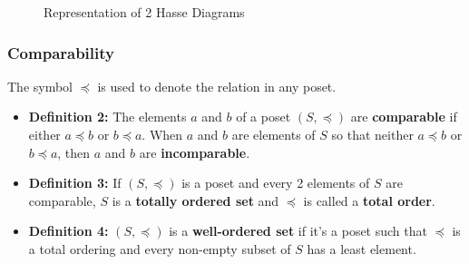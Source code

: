 \documentclass{article}
\begin{document}
\begin{figure}%
    \centering
    \qquad
    \caption{Representation of 2 Hasse Diagrams}%
    \label{fig:hassediagrams}%
\end{figure}

\subsubsection{Comparability} The symbol $ \preceq $ is used to denote the relation in any poset.
\begin{itemize}
\item \textbf{Definition 2:} The elements $ a $ and $ b $ of a poset $ (S, \preceq) $ are \textbf{comparable} if either $ a \preceq b $ or $ b \preceq a $. When $ a $ and $ b $ are elements of $ S $ so that neither $ a \preceq b $ or $ b \preceq a $, then $ a $ and $ b $ are \textbf{incomparable}.
\item \textbf{Definition 3:} If $ (S, \preceq) $ is a poset and every 2 elements of $ S $ are comparable, $ S $ is a \textbf{totally ordered set} and $ \preceq $ is called a \textbf{total order}.
\item \textbf{Definition 4:} $ (S, \preceq) $ is a \textbf{well-ordered set} if it's a poset such that $ \preceq $ is a total ordering and every non-empty subset of $ S $ has a least element.
\end{itemize}
\end{document}
